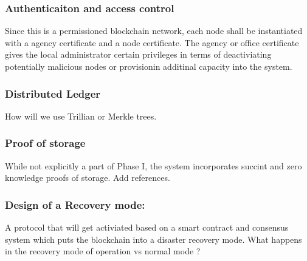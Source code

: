 \subsubsection{Authenticaiton and access control}

Since this is a permissioned blockchain network, each node shall be instantiated with a agency certificate and a node
certificate. The agency or office certificate gives the local administrator certain privileges in terms of deactiviating
potentially malicious nodes or provisionin additinal capacity into the system.

\subsubsection{Distributed Ledger}

How will we use Trillian or Merkle trees.
 
\subsubsection{Proof of storage}

While not explicitly a part of Phase I, the system incorporates succint and zero knowledge proofs of storage. Add
references.


\subsubsection{Design of a Recovery mode:}

A protocol that will get activiated based on a smart contract and consensus system which puts the blockchain into a
disaster recovery mode.
What happens in the recovery mode of operation vs normal mode ?
